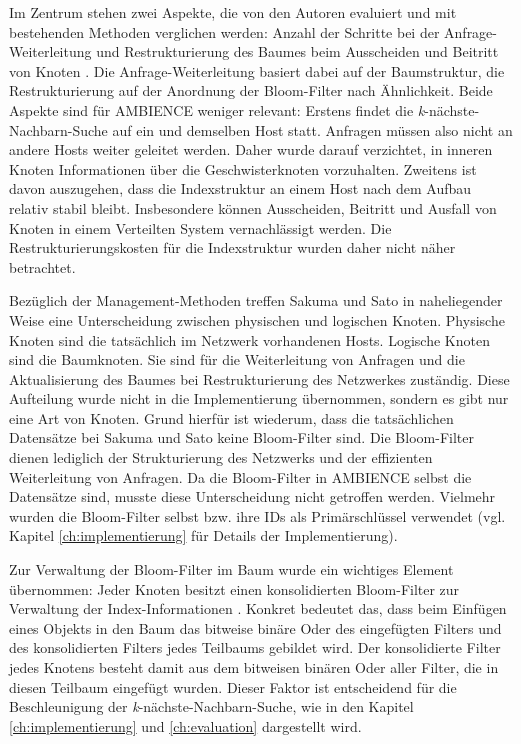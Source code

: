 Im Zentrum stehen zwei Aspekte, die von den Autoren evaluiert und mit bestehenden Methoden verglichen werden: Anzahl der Schritte bei der Anfrage-Weiterleitung und Restrukturierung des Baumes beim Ausscheiden und Beitritt von Knoten \cite{Sakuma2011}. Die Anfrage-Weiterleitung basiert dabei auf der Baumstruktur, die Restrukturierung auf der Anordnung der Bloom-Filter nach Ähnlichkeit. Beide Aspekte sind für AMBIENCE weniger relevant: Erstens findet die \textit{k}-nächste-Nachbarn-Suche auf ein und demselben Host statt. Anfragen müssen also nicht an andere Hosts weiter geleitet werden. Daher wurde darauf verzichtet, in inneren Knoten Informationen über die Geschwisterknoten vorzuhalten. Zweitens ist davon auszugehen, dass die Indexstruktur an einem Host nach dem Aufbau relativ stabil bleibt. Insbesondere können Ausscheiden, Beitritt und Ausfall von Knoten in einem Verteilten System vernachlässigt werden. Die Restrukturierungskosten für die Indexstruktur wurden daher nicht näher betrachtet.  

Bezüglich der Management-Methoden treffen Sakuma und Sato in naheliegender Weise eine Unterscheidung zwischen physischen und logischen Knoten. Physische Knoten sind die tatsächlich im Netzwerk vorhandenen Hosts. Logische Knoten sind die Baumknoten. Sie sind für die Weiterleitung von Anfragen und die Aktualisierung des Baumes bei Restrukturierung des Netzwerkes zuständig. Diese Aufteilung wurde nicht in die Implementierung übernommen, sondern es gibt nur eine Art von Knoten. Grund hierfür ist wiederum, dass die tatsächlichen Datensätze bei Sakuma und Sato keine Bloom-Filter sind. Die Bloom-Filter dienen lediglich der Strukturierung des Netzwerks und der effizienten Weiterleitung von Anfragen. Da die Bloom-Filter in AMBIENCE selbst die Datensätze sind, musste diese Unterscheidung nicht getroffen werden. Vielmehr wurden die Bloom-Filter selbst bzw. ihre IDs als Primärschlüssel verwendet (vgl. Kapitel \ref{ch:implementierung} für Details der Implementierung). 

Zur Verwaltung der Bloom-Filter im Baum wurde ein wichtiges Element übernommen: Jeder Knoten besitzt einen konsolidierten Bloom-Filter zur Verwaltung der Index-Informationen \cite{Sakuma2011}. Konkret bedeutet das, dass beim Einfügen eines Objekts in den Baum das bitweise binäre Oder des eingefügten Filters und des konsolidierten Filters jedes Teilbaums gebildet wird. Der konsolidierte Filter jedes Knotens besteht damit aus dem bitweisen binären Oder aller Filter, die in diesen Teilbaum eingefügt wurden. Dieser Faktor ist entscheidend für die Beschleunigung der \textit{k}-nächste-Nachbarn-Suche, wie in den Kapitel \ref{ch:implementierung} und \ref{ch:evaluation} dargestellt wird. 

